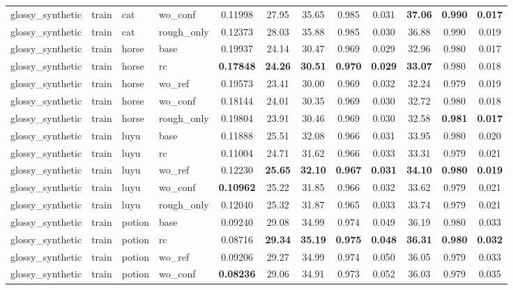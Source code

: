 \begin{table}[t]
{\begin{tabular}{llllcccccccc}
glossy\_synthetic & train & cat & wo\_conf & 0.11998 & 27.95 & 35.65 & 0.985 & 0.031 & \textbf{37.06} & \textbf{0.990} & \textbf{0.017} \\
glossy\_synthetic & train & cat & rough\_only & 0.12373 & 28.03 & 35.88 & 0.985 & 0.030 & 36.88 & 0.990 & 0.019 \\
glossy\_synthetic & train & horse & base & 0.19937 & 24.14 & 30.47 & 0.969 & 0.029 & 32.96 & 0.980 & 0.017 \\
glossy\_synthetic & train & horse & rc & \textbf{0.17848} & \textbf{24.26} & \textbf{30.51} & \textbf{0.970} & \textbf{0.029} & \textbf{33.07} & 0.980 & 0.018 \\
glossy\_synthetic & train & horse & wo\_ref & 0.19573 & 23.41 & 30.00 & 0.969 & 0.032 & 32.24 & 0.979 & 0.019 \\
glossy\_synthetic & train & horse & wo\_conf & 0.18144 & 24.01 & 30.35 & 0.969 & 0.030 & 32.72 & 0.980 & 0.018 \\
glossy\_synthetic & train & horse & rough\_only & 0.19804 & 23.91 & 30.46 & 0.969 & 0.030 & 32.58 & \textbf{0.981} & \textbf{0.017} \\
glossy\_synthetic & train & luyu & base & 0.11888 & 25.51 & 32.08 & 0.966 & 0.031 & 33.95 & 0.980 & 0.020 \\
glossy\_synthetic & train & luyu & rc & 0.11004 & 24.71 & 31.62 & 0.966 & 0.033 & 33.31 & 0.979 & 0.021 \\
glossy\_synthetic & train & luyu & wo\_ref & 0.12230 & \textbf{25.65} & \textbf{32.10} & \textbf{0.967} & \textbf{0.031} & \textbf{34.10} & \textbf{0.980} & \textbf{0.019} \\
glossy\_synthetic & train & luyu & wo\_conf & \textbf{0.10962} & 25.22 & 31.85 & 0.966 & 0.032 & 33.62 & 0.979 & 0.021 \\
glossy\_synthetic & train & luyu & rough\_only & 0.12040 & 25.32 & 31.87 & 0.965 & 0.033 & 33.74 & 0.979 & 0.021 \\
glossy\_synthetic & train & potion & base & 0.09240 & 29.08 & 34.99 & 0.974 & 0.049 & 36.19 & 0.980 & 0.033 \\
glossy\_synthetic & train & potion & rc & 0.08716 & \textbf{29.34} & \textbf{35.19} & \textbf{0.975} & \textbf{0.048} & \textbf{36.31} & \textbf{0.980} & \textbf{0.032} \\
glossy\_synthetic & train & potion & wo\_ref & 0.09206 & 29.27 & 34.99 & 0.974 & 0.050 & 36.05 & 0.979 & 0.033 \\
glossy\_synthetic & train & potion & wo\_conf & \textbf{0.08236} & 29.06 & 34.91 & 0.973 & 0.052 & 36.03 & 0.979 & 0.035 \\

\end{tabular}}
\end{table}
